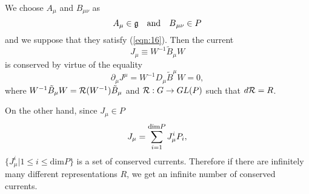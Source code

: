 \documentclass[makeidx,12pt,openany]{report}
\begin{document}
We choose $A_{\mu}$ and $B_{\mu \nu}$ as 
\begin{equation}
 A_{\mu} \in \frak g \quad \mbox{and} \quad \mbox{$B$}_{\mu \nu} \in \mbox{$P$}
\end{equation}
and we suppose that they satisfy (\ref{eqn:16}). Then the current 
\begin{equation}
 J_{\mu} \equiv W^{-1}\tilde{B}_{\mu}W
 \label{eqn:21}
\end{equation}
is conserved by virtue of the equality 
\begin{equation}
 \partial_{\mu}J^{\mu}=W^{-1}D_{\mu}\tilde{B}^{\mu}W=0, 
\end{equation}
where $W^{-1}\tilde{B}_{\mu}W=\mbox{$\cal{R}$}(W^{-1})\tilde{B}_{\mu}$ 
and $\mbox{$\cal{R}$}:G \rightarrow GL(\mbox{$P$})$ such that 
$d \mbox{$\cal{R}$}=R$. 

On the other hand, since $J_{\mu} \in P$
\begin{equation}
 J_{\mu}=\sum_{i=1}^{\mbox{\footnotesize{dim$P$}}} J_{\mu}^i P_i,
\end{equation}
$\{ J_{\mu}^i | 1 \le i \le \mbox{dim}P \} $ is a set of conserved currents. 
Therefore if there are infinitely many different representations $R$, we 
get an infinite number of conserved currents. 
\end{document}
